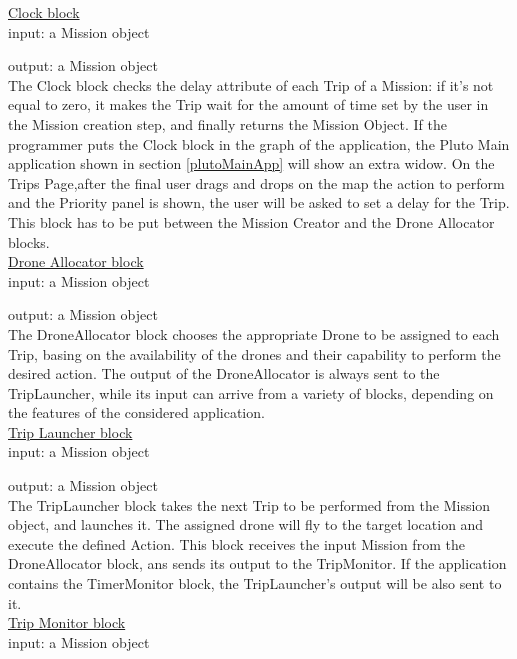 \underline{Clock block}
\\

input: a Mission object

output: a Mission object
\\

The Clock block checks the delay attribute of each Trip of a Mission: if it's not equal to zero, it makes the Trip wait for the amount of time set by the user in the Mission creation step, and finally returns the Mission Object.
If the programmer puts the Clock block in the graph of the application, the Pluto Main application shown in section \ref{plutoMainApp} will show an extra widow.
On the Trips Page,after the final user drags and drops on the map the action to perform and the Priority panel is shown, the user will be asked to set a delay for the Trip.
This block has to be put between the Mission Creator and the Drone Allocator blocks.
\\

\underline{Drone Allocator block}
\\

input: a Mission object

output: a Mission object
\\

The DroneAllocator block chooses the appropriate Drone to be assigned to each Trip, basing on the availability of the drones and their capability to perform the desired action.
The output of the DroneAllocator is always sent to the TripLauncher, while its input can arrive from a variety of blocks, depending on the features of the considered application.
\\

\underline{Trip Launcher block}
\\

input: a Mission object

output: a Mission object
\\
The TripLauncher block takes the next Trip to be performed from the Mission object, and launches it.
The assigned drone will fly to the target location and execute the defined Action.
This block receives the input Mission from the DroneAllocator block, ans sends its output to the TripMonitor.
If the application contains the TimerMonitor block, the TripLauncher's output will be also sent to it.
\\

\underline{Trip Monitor block}
\\

input: a Mission object

